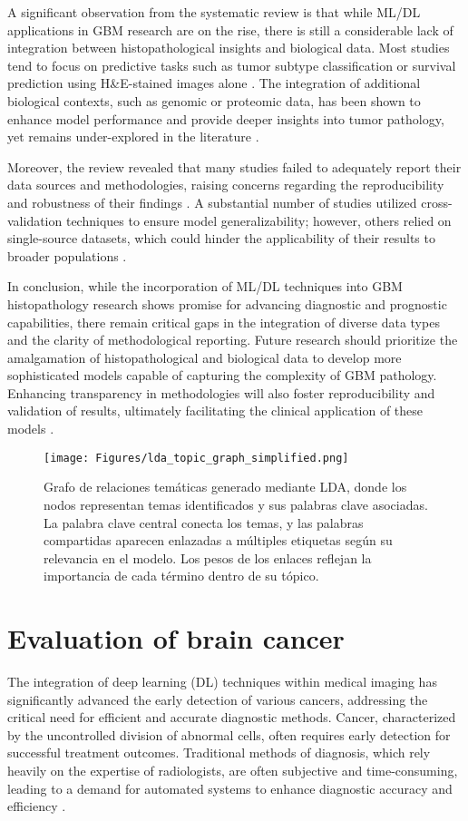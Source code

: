 \documentclass[runningheads]{llncs}
\begin{document}
A significant observation from the systematic review is that while ML/DL applications in GBM research are on the rise, there is still a considerable lack of integration between histopathological insights and biological data. Most studies tend to focus on predictive tasks such as tumor subtype classification or survival prediction using H\&E-stained images alone \cite{Chun_2025}. The integration of additional biological contexts, such as genomic or proteomic data, has been shown to enhance model performance and provide deeper insights into tumor pathology, yet remains under-explored in the literature \cite{Chun_2025}.

Moreover, the review revealed that many studies failed to adequately report their data sources and methodologies, raising concerns regarding the reproducibility and robustness of their findings \cite{Chun_2025}. A substantial number of studies utilized cross-validation techniques to ensure model generalizability; however, others relied on single-source datasets, which could hinder the applicability of their results to broader populations \cite{Chun_2025}.

In conclusion, while the incorporation of ML/DL techniques into GBM histopathology research shows promise for advancing diagnostic and prognostic capabilities, there remain critical gaps in the integration of diverse data types and the clarity of methodological reporting. Future research should prioritize the amalgamation of histopathological and biological data to develop more sophisticated models capable of capturing the complexity of GBM pathology. Enhancing transparency in methodologies will also foster reproducibility and validation of results, ultimately facilitating the clinical application of these models \cite{Chun_2025}.
\begin{figure}[h]
\centering
\texttt{[image: Figures/lda\_topic\_graph\_simplified.png]}
\caption{Grafo de relaciones temáticas generado mediante LDA, donde los nodos representan temas identificados y sus palabras clave asociadas. La palabra clave central conecta los temas, y las palabras compartidas aparecen enlazadas a múltiples etiquetas según su relevancia en el modelo. Los pesos de los enlaces reflejan la importancia de cada término dentro de su tópico.}
\end{figure}
\section{Evaluation of brain cancer}
The integration of deep learning (DL) techniques within medical imaging has significantly advanced the early detection of various cancers, addressing the critical need for efficient and accurate diagnostic methods. Cancer, characterized by the uncontrolled division of abnormal cells, often requires early detection for successful treatment outcomes. Traditional methods of diagnosis, which rely heavily on the expertise of radiologists, are often subjective and time-consuming, leading to a demand for automated systems to enhance diagnostic accuracy and efficiency \cite{Istiak_2024}. 
\end{document}
